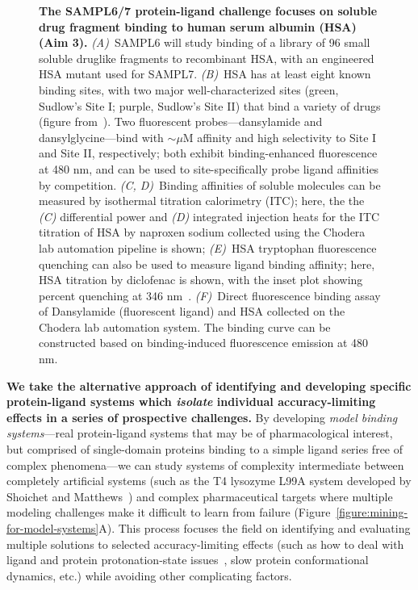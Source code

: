 \documentclass[11pt]{article}
\begin{document}
\begin{figure}[h]
\begin{centering}
\end{centering}
\vspace{-0.1in}
\caption{\footnotesize {\bf The SAMPL6/7 protein-ligand challenge focuses on soluble drug fragment binding to human serum albumin (HSA) (Aim 3).}
\emph{(A)}~SAMPL6 will study binding of a library of 96 small soluble druglike fragments to recombinant HSA, with an engineered HSA mutant used for SAMPL7.
\emph{(B)}~HSA has at least eight known binding sites, with two major well-characterized sites (green, Sudlow's Site I; purple, Sudlow's Site II) that bind a variety of drugs (figure from~\cite{Hall:2013:JournalofChemicalInformationandModeling}).
Two fluorescent probes---dansylamide and dansylglycine---bind with $\sim$$\mu$M affinity and high selectivity to Site I and Site II, respectively; both exhibit binding-enhanced fluorescence at 480 nm, and can be used to site-specifically probe ligand affinities by competition.
\emph{(C, D)}~Binding affinities of soluble molecules can be measured by isothermal titration calorimetry (ITC); here, the the \emph{(C)} differential power and \emph{(D)} integrated injection heats for the ITC titration of HSA by naproxen sodium collected using the Chodera lab automation pipeline is shown;
\emph{(E)}~HSA tryptophan fluorescence quenching can also be used to measure ligand binding affinity; here, HSA titration by diclofenac is shown, with the inset plot showing percent quenching at 346 nm~\cite{Epps:1999:JournalofPharmacyandPharmacology,Bou-Abdallah:2016:TheJournalofChemicalThermodynamics}.
\emph{(F)}~Direct fluorescence binding assay of Dansylamide (fluorescent ligand) and HSA collected on the Chodera lab automation system. 
The binding curve can be constructed based on binding-induced fluorescence emission at 480 nm.
\vspace{-0.25in}
\label{figure:hsa-challenge}}
\end{figure}

{\bf We take the alternative approach of identifying and developing specific protein-ligand systems which \emph{isolate} individual accuracy-limiting effects in a series of prospective challenges.}
By developing \emph{model binding systems}---real protein-ligand systems that may be of pharmacological interest, but comprised of single-domain proteins binding to a simple ligand series free of complex phenomena---we can study systems of complexity intermediate between completely artificial systems (such as the T4 lysozyme L99A system developed by Shoichet and Matthews~\cite{mobley_predicting_2007,merski_homologous_2015, mobley_predicting_2016}) and complex pharmaceutical targets where multiple modeling challenges make it difficult to learn from failure (Figure~\ref{figure:mining-for-model-systems}A).
This process focuses the field on identifying and evaluating multiple solutions to selected accuracy-limiting effects (such as how to deal with ligand and protein protonation-state issues~\cite{Onufriev:2013:QuarterlyReviewsofBiophysics}, slow protein conformational dynamics, etc.) while avoiding other complicating factors.
\end{document}
